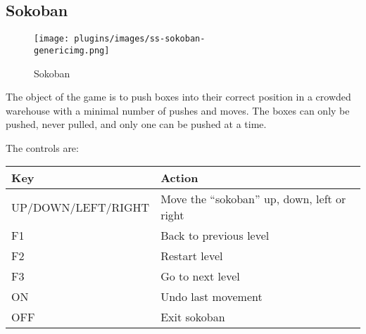 \subsection{Sokoban}
\begin{figure}[h!]
\begin{center}
\texttt{[image: plugins/images/ss-sokoban-\\genericimg.png]}
\end{center}
\caption{Sokoban}
\end{figure}

The object of the game is to push boxes into their correct position in a
crowded warehouse with a minimal number of pushes and moves. The boxes
can only be pushed, never pulled, and only one can be pushed at a time.

The controls are:

\begin{table}[h!]
\begin{tabular}{@{}ll@{}}\toprule
\textbf{Key} & \textbf{Action} \\\midrule
UP/DOWN/LEFT/RIGHT & Move the ``sokoban'' up, down, left or right \\
F1 & Back to previous level \\
F2 & Restart level \\
F3 & Go to next level \\
ON & Undo last movement \\
OFF & Exit sokoban \\\bottomrule
\end{tabular}
\end{table}


